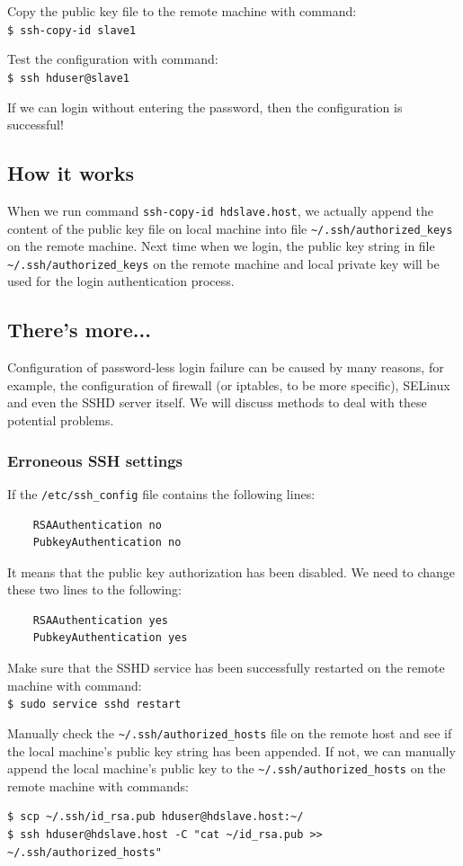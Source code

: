 Copy the public key file to the remote machine with command: \\
\verb|$ ssh-copy-id slave1|

Test the configuration with command: \\
\verb|$ ssh hduser@slave1|

If we can login without entering the password, then the configuration is successful!
\subsection*{How it works}
When we run command \verb|ssh-copy-id hdslave.host|, we actually append the content of the public key file on local machine into file \verb|~/.ssh/authorized_keys| on the remote machine. Next time when we login, the public key string in file \verb|~/.ssh/authorized_keys| on the remote machine and local private key will be used for the login authentication process.
\subsection*{There's more...}
Configuration of password-less login failure can be caused by many reasons, for example, the configuration of firewall (or iptables, to be more specific), SELinux and even the SSHD server itself. We will discuss methods to deal with these potential problems.
\subsubsection*{Erroneous SSH settings}
If the \verb|/etc/ssh_config| file contains the following lines:
\begin{verbatim}
    RSAAuthentication no
    PubkeyAuthentication no
\end{verbatim}

It means that the public key authorization has been disabled. We need to change these two lines to the following:
\begin{verbatim}
    RSAAuthentication yes
    PubkeyAuthentication yes
\end{verbatim}

Make sure that the SSHD service has been successfully restarted on the remote machine with command: \\
\verb|$ sudo service sshd restart|

Manually check the \verb|~/.ssh/authorized_hosts| file on the remote host and see if the local machine's public key string has been appended. If not, we can manually append the local machine's public key to the \verb|~/.ssh/authorized_hosts| on the remote machine with commands:
\lstset{style=bashstyle}
\begin{lstlisting}
$ scp ~/.ssh/id_rsa.pub hduser@hdslave.host:~/
$ ssh hduser@hdslave.host -C "cat ~/id_rsa.pub >> ~/.ssh/authorized_hosts"
\end{lstlisting}

